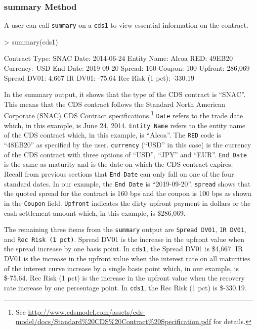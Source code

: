 \documentclass{jss}
\begin{document}
\subsubsection{summary Method}
\label{sec:SummaryFunction}

A user can call \texttt{summary} on a \texttt{cds1} to view essential information on the contract.

\begin{Schunk}
\begin{Sinput}
> summary(cds1)
\end{Sinput}
\begin{Soutput}
Contract Type:                      SNAC   Date:                      2014-06-24
Entity Name:                       Alcoa   RED:                           49EB20
Currency:                            USD   End Date:                  2019-09-20
Spread:                              160   Coupon:                           100
Upfront:                         286,069   Spread DV01:                    4,667
IR DV01:                          -75.64   Rec Risk (1 pct):             -330.19
\end{Soutput}
\end{Schunk}

In the summary output, it shows that the type of the CDS contract is ``SNAC''. This means that the CDS contract follows the Standard North American Corporate (SNAC) CDS Contract specifications.\footnote{See \url{http://www.cdsmodel.com/assets/cds-model/docs/Standard\%20CDS\%20Contract\%20Specification.pdf} for details.}  \texttt{Date} refers to the trade date which, in this example, is June 24, 2014. \texttt{Entity Name} refers to the entity name of the CDS contract which, in this example, is ``Alcoa''. The \texttt{RED} code is ``48EB20'' as specified by the user. \texttt{currency} (``USD'' in this case) is the currency of the CDS contract with three options of ``USD'', ``JPY'' and ``EUR''. \texttt{End Date} is the same as maturity and is the date on which the CDS contract expires. Recall from previous sections that \texttt{End Date} can only fall on one of the four standard dates. In our example, the \texttt{End Date} is ``2019-09-20''. \texttt{spread} shows that the quoted spread for the contract is 160 bps and the coupon is 100 bps as shown in the \texttt{Coupon} field. \texttt{Upfront} indicates the dirty upfront payment in dollars or the cash settlement amount which, in this example, is \$286,069.

The remaining three items from the \texttt{summary} output  are \texttt{Spread DV01}, \texttt{IR DV01}, and \texttt{Rec Risk (1 pct)}. Spread DV01 is the increase in the upfront value when the spread increase by one basis point. In \texttt{cds1}, the Spread DV01 is \$4,667. IR DV01 is the increase in the upfront value when the interest rate on all maturities of the interest curve increase by a single basis point which, in our example, is \$-75.64. Rec Risk (1 pct) is the increase in the upfront value when the recovery rate increase by one percentage point. In \texttt{cds1}, the Rec Risk (1 pct) is \$-330.19.
\end{document}
